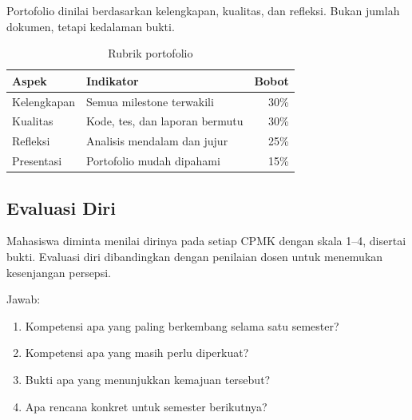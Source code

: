 Portofolio dinilai berdasarkan kelengkapan, kualitas, dan refleksi.
Bukan jumlah dokumen, tetapi kedalaman bukti.

\begin{table}[H]
\centering
\caption{Rubrik portofolio}
\label{tab:ch17-portofolio}
\begin{tabularx}{\textwidth}{@{}l X r@{}}
\toprule
\textbf{Aspek} & \textbf{Indikator} & \textbf{Bobot} \\
\midrule
Kelengkapan & Semua milestone terwakili & 30\% \\
Kualitas & Kode, tes, dan laporan bermutu & 30\% \\
Refleksi & Analisis mendalam dan jujur & 25\% \\
Presentasi & Portofolio mudah dipahami & 15\% \\
\bottomrule
\end{tabularx}
\end{table}

\subsection{Evaluasi Diri}

Mahasiswa diminta menilai dirinya pada setiap CPMK dengan skala
1--4, disertai bukti. Evaluasi diri dibandingkan dengan penilaian
dosen untuk menemukan kesenjangan persepsi.

\begin{reflectionbox}
Jawab:
\begin{enumerate}[label=\arabic*.,leftmargin=*]
  \item Kompetensi apa yang paling berkembang selama satu semester?
  \item Kompetensi apa yang masih perlu diperkuat?
  \item Bukti apa yang menunjukkan kemajuan tersebut?
  \item Apa rencana konkret untuk semester berikutnya?
\end{enumerate}
\end{reflectionbox}
